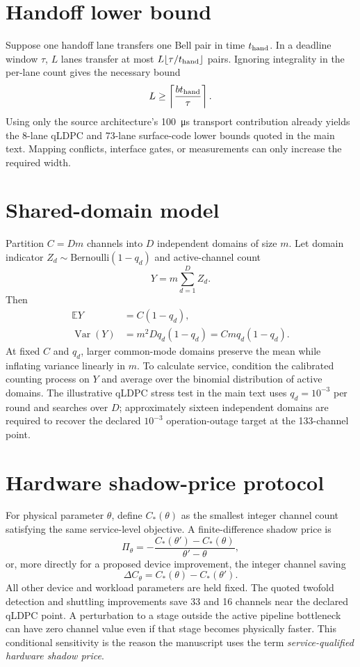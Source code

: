 \documentclass[aps,prx,preprint,superscriptaddress,nofootinbib,longbibliography]{revtex4-2}
\newcommand{\E}{\mathbb E}\newcommand{\Prob}{\mathbb P}
\begin{document}
\section{Handoff lower bound}
Suppose one handoff lane transfers one Bell pair in time $t_{\rm hand}$. In a deadline window $\tau$, $L$ lanes transfer at most $L\lfloor\tau/t_{\rm hand}\rfloor$ pairs. Ignoring integrality in the per-lane count gives the necessary bound
\begin{equation}
 L\ge\left\lceil\frac{bt_{\rm hand}}{\tau}\right\rceil.
\end{equation}
Using only the source architecture's \SI{100}{\micro s} transport contribution already yields the 8-lane qLDPC and 73-lane surface-code lower bounds quoted in the main text. Mapping conflicts, interface gates, or measurements can only increase the required width.

\section{Shared-domain model}
Partition $C=Dm$ channels into $D$ independent domains of size $m$. Let domain indicator $Z_d\sim\mathrm{Bernoulli}(1-q_d)$ and active-channel count
\begin{equation}
 Y=m\sum_{d=1}^{D}Z_d.
\end{equation}
Then
\begin{align}
 \E Y &= C(1-q_d),\\
 \operatorname{Var}(Y)&=m^2Dq_d(1-q_d)=Cm q_d(1-q_d).
\end{align}
At fixed $C$ and $q_d$, larger common-mode domains preserve the mean while inflating variance linearly in $m$. To calculate service, condition the calibrated counting process on $Y$ and average over the binomial distribution of active domains. The illustrative qLDPC stress test in the main text uses $q_d=10^{-3}$ per round and searches over $D$; approximately sixteen independent domains are required to recover the declared $10^{-3}$ operation-outage target at the 133-channel point.

\section{Hardware shadow-price protocol}
For physical parameter $\theta$, define $C_*(\theta)$ as the smallest integer channel count satisfying the same service-level objective. A finite-difference shadow price is
\begin{equation}
 \Pi_\theta=-\frac{C_*(\theta')-C_*(\theta)}{\theta'-\theta},
\end{equation}
or, more directly for a proposed device improvement, the integer channel saving
\begin{equation}
 \Delta C_\theta=C_*(\theta)-C_*(\theta').
\end{equation}
All other device and workload parameters are held fixed. The quoted twofold detection and shuttling improvements save 33 and 16 channels near the declared qLDPC point. A perturbation to a stage outside the active pipeline bottleneck can have zero channel value even if that stage becomes physically faster. This conditional sensitivity is the reason the manuscript uses the term \emph{service-qualified hardware shadow price}.
\end{document}
